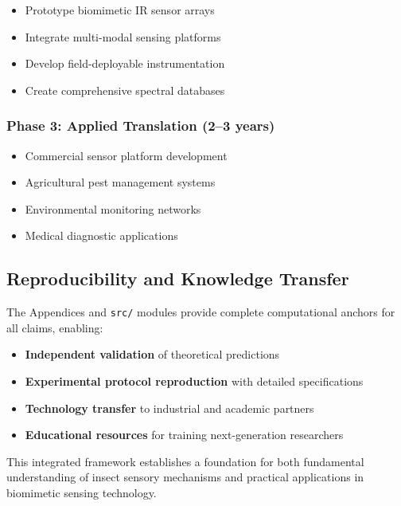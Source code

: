 \documentclass[
  13pt,
  a4paperpaper,
  12pt]{article}
\newcommand{\passthrough}[1]{#1}
\providecommand{\tightlist}{%
  \setlength{\itemsep}{0pt}\setlength{\parskip}{0pt}}
\begin{document}
\begin{itemize}
\tightlist
\item
  Prototype biomimetic IR sensor arrays
\item
  Integrate multi-modal sensing platforms
\item
  Develop field-deployable instrumentation
\item
  Create comprehensive spectral databases
\end{itemize}

\subsubsection{Phase 3: Applied Translation (2--3
years)}\label{phase-3-applied-translation-23-years}

\begin{itemize}
\tightlist
\item
  Commercial sensor platform development
\item
  Agricultural pest management systems
\item
  Environmental monitoring networks
\item
  Medical diagnostic applications
\end{itemize}

\subsection{Reproducibility and Knowledge
Transfer}\label{reproducibility-and-knowledge-transfer}

The Appendices and \passthrough{\lstinline!src/!} modules provide
complete computational anchors for all claims, enabling:

\begin{itemize}
\tightlist
\item
  \textbf{Independent validation} of theoretical predictions
\item
  \textbf{Experimental protocol reproduction} with detailed
  specifications
\item
  \textbf{Technology transfer} to industrial and academic partners
\item
  \textbf{Educational resources} for training next-generation
  researchers
\end{itemize}

This integrated framework establishes a foundation for both fundamental
understanding of insect sensory mechanisms and practical applications in
biomimetic sensing technology.
\end{document}

